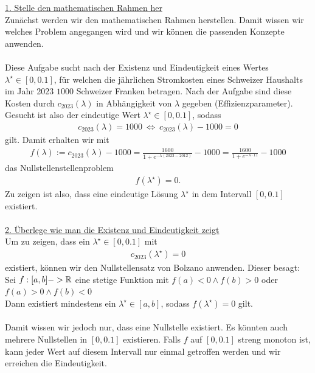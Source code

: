 \underline{1. Stelle den mathematischen Rahmen her}\\
Zunächst werden wir den mathematischen Rahmen herstellen. Damit wissen wir welches Problem angegangen wird und wir können die passenden Konzepte anwenden.\\
\\
Diese Aufgabe sucht nach der Existenz und Eindeutigkeit eines Wertes $\lambda^\star \in [0,0.1]$, für welchen die jährlichen Stromkosten eines Schweizer Haushalts im Jahr 2023 $1000$ Schweizer Franken betragen.
Nach der Aufgabe sind diese Kosten durch $c_{2023}(\lambda)$ in Abhängigkeit von $\lambda$ gegeben (Effizienzparameter).
Gesucht ist also der eindeutige Wert $\lambda^\star \in [0,0.1]$, sodass 
\begin{align*}
	c_{2023}(\lambda) = 1000
	\ \Leftrightarrow \ 
	c_{2023}(\lambda) - 1000 = 0
\end{align*}
gilt. Damit erhalten wir mit 
\begin{align*}
	f(\lambda) := c_{2023}(\lambda) - 1000 
	=
	\frac{1600}{1 + e^{- \lambda (2023 - 2012)}} - 1000
	=
	\frac{1600}{1 + e^{- \lambda\cdot 11}} - 1000
\end{align*}
das Nullstellenstellenproblem
\begin{align*}
	f(\lambda^\star) = 0.
\end{align*}
Zu zeigen ist also, dass eine eindeutige Lösung $\lambda^\star$ in dem Intervall $[0, 0.1]$ existiert.\\
\\
\underline{2. Überlege wie man die Existenz und Eindeutigkeit zeigt}\\
Um zu zeigen, dass ein $\lambda^\star  \in [0,0.1]$ mit
\begin{align*}
	c_{2023}(\lambda^\star) = 0
\end{align*}
existiert, können wir den Nullstellensatz von Bolzano anwenden. Dieser besagt:\\
Sei $f:[a,b] -> \mathbb{R}$ eine stetige Funktion mit $f(a) < 0 \wedge f(b) > 0 $ oder $f(a) > 0 \wedge f(b) < 0$\\
Dann existiert mindestens ein $\lambda^\star \in [a,b]$, sodass $f(\lambda^\star) = 0$ gilt.\\
\\
Damit wissen wir jedoch nur, dass eine Nullstelle existiert. Es könnten auch mehrere Nullstellen in $[0,0.1]$ existieren. 
Falls $f $ auf $[0,0.1]$ streng monoton ist, kann jeder Wert auf diesem Intervall nur einmal getroffen werden und wir erreichen die Eindeutigkeit.\\
